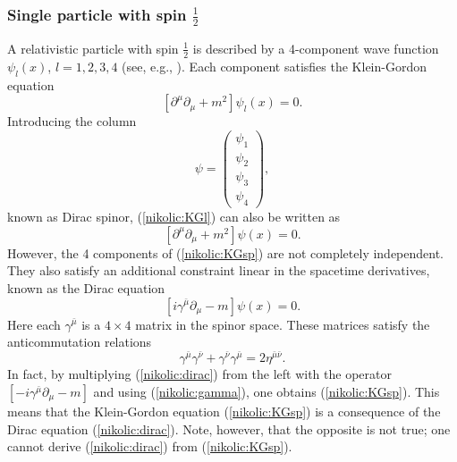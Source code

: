 \documentclass[12pt,twoside]{report} %
\begin{document}
\subsubsection{Single particle with spin $\frac{1}{2}$}

A relativistic particle with spin $\frac{1}{2}$ is described by a 4-component wave function
$\psi_l(x)$, $l=1,2,3,4$ (see, e.g., \cite{bd1}). Each component satisfies
the Klein-Gordon equation
\begin{equation}\label{nikolic:KGl}
 [\partial^{\mu}\partial_{\mu}+m^2]\psi_l(x) =0 .
\end{equation} 
Introducing the column
\begin{equation} 
\psi=\left( 
\begin{array}{c} 
 \psi_1 \\ \psi_2 \\ \psi_3 \\ \psi_4
\end{array}
\right) ,
\end{equation}
known as Dirac spinor, (\ref{nikolic:KGl}) can also be written as
\begin{equation}\label{nikolic:KGsp}
 [\partial^{\mu}\partial_{\mu}+m^2]\psi(x) =0 .
\end{equation}
However, the 4 components of (\ref{nikolic:KGsp}) are not completely independent.
They also satisfy an additional constraint linear in the spacetime derivatives,
known as the Dirac equation
\begin{equation}\label{nikolic:dirac}
[i\gamma^{\bar{\mu}}\partial_{\mu}-m]\psi(x)=0 .
\end{equation}
Here each $\gamma^{\bar{\mu}}$ is a $4\times4$ matrix in the spinor space.
These matrices satisfy the anticommutation relations
\begin{equation}\label{nikolic:gamma}
 \gamma^{\bar{\mu}}\gamma^{\bar{\nu}}+\gamma^{\bar{\nu}}\gamma^{\bar{\mu}}
=2\eta^{\bar{\mu}\bar{\nu}} .
\end{equation}
In fact, by multiplying (\ref{nikolic:dirac}) from the left with the operator
$[-i\gamma^{\bar{\mu}}\partial_{\mu}-m]$ and using (\ref{nikolic:gamma}), one
obtains (\ref{nikolic:KGsp}). This means that the Klein-Gordon equation (\ref{nikolic:KGsp})
is a consequence of the Dirac equation (\ref{nikolic:dirac}). Note, however, that the
opposite is not true; one cannot derive (\ref{nikolic:dirac}) from (\ref{nikolic:KGsp}).
\end{document}
